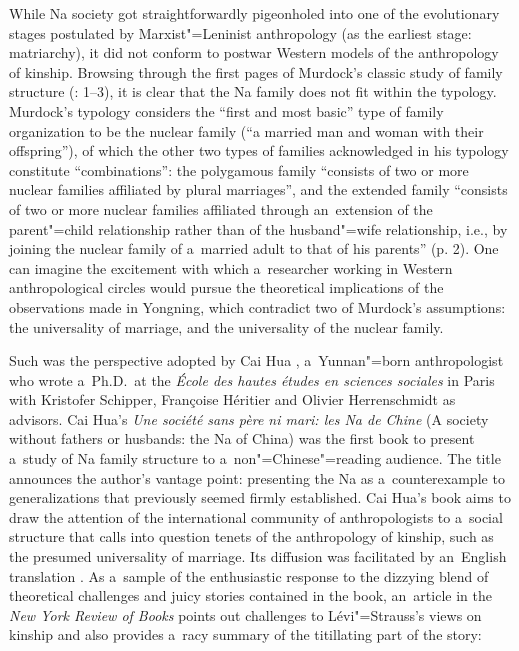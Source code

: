 While Na society got straightforwardly pigeonholed into one of the evolutionary stages postulated by
Marxist"=Leninist anthropology (as the earliest stage: matriarchy), it did not conform to postwar
Western models of the anthropology of kinship. Browsing through the first pages of Murdock’s classic
study of family structure (\citeyear{murdock1949}: 1--3), it is clear that the Na family does not
fit within the typology. Murdock’s typology considers the “first and most basic” type of family
organization to be the nuclear family (“a married man and woman with their offspring”), of which the
other two types of families acknowledged in his typology constitute “combinations”: the polygamous
family “consists of two or more nuclear families affiliated by plural marriages”, and the extended
family “consists of two or more nuclear families affiliated through an~extension of the parent"=child
relationship rather than of the husband"=wife relationship, i.e., by joining the nuclear family of
a~married adult to that of his parents” (p. 2). One can imagine the excitement with which
a~researcher working in Western anthropological circles would pursue the theoretical implications of
the observations made in Yongning, which contradict two of Murdock’s assumptions: the universality of marriage, and the universality of the nuclear family.

Such was the perspective adopted by 
Cai Hua , a~Yunnan"=born anthropologist who wrote
a~Ph.D.\ at the \textit{École des hautes études en sciences sociales} in Paris with Kristofer Schipper,
Françoise Héritier and Olivier Herrenschmidt as advisors. Cai Hua’s \textit{Une société sans père ni
	mari: les Na de Chine} (A society without fathers or husbands: the Na of China) \citep{cai1997}
was the first book to present a~study of Na family structure to a~non"=Chinese"=reading audience. The
title announces the author’s vantage point: presenting the Na as a~{counterexample} to generalizations
that previously seemed firmly established. Cai Hua’s book aims to draw the attention of the international
community of anthropologists to a~social structure that calls into {question} tenets of the
anthropology of kinship, such as the presumed universality of marriage. Its diffusion was
facilitated by an~{English} translation \citep{cai2001}. As a~sample of the enthusiastic response to the dizzying blend of theoretical
challenges and juicy stories contained in the book, an~article in the \textit{New York Review of
	Books} \citep{geertz2001} points out challenges to Lévi"=Strauss’s views on kinship
\citep{levistrauss1949} and also provides a~racy summary of the titillating part of the story:

